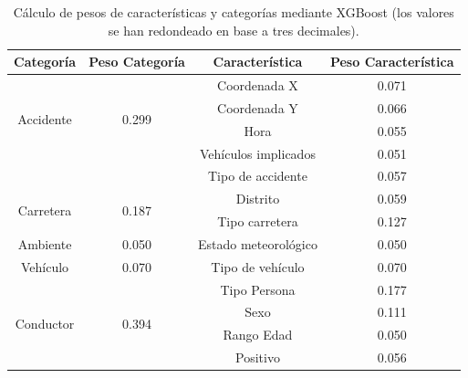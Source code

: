   \begin{table}[H]
    \centering
    \begin{tabular}{ |c|c|c|c| }
         \hline
         \textbf{Categoría} & \textbf{Peso Categoría} & \textbf{Característica} & \textbf{Peso Característica}\\

         \hline
         \multirow{4}{*}{Accidente}   & \multirow{4}{*}{0.299}        & Coordenada X          & 0.071\\
                                      &                               & Coordenada Y          & 0.066\\
                                      &                               & Hora                  & 0.055\\
                                      &                               & Vehículos implicados  & 0.051\\
                                      &                               & Tipo de accidente     & 0.057\\

         \hline
         \multirow{2}{*}{Carretera}   & \multirow{2}{*}{0.187}        & Distrito              & 0.059\\      
                                      &                               & Tipo carretera        & 0.127\\

         \hline
         \multirow{1}{*}{Ambiente}    & \multirow{1}{*}{0.050}        & Estado meteorológico  & 0.050\\

         \hline
         \multirow{1}{*}{Vehículo}    & \multirow{1}{*}{0.070}        & Tipo de vehículo      & 0.070\\


         \hline
         \multirow{4}{*}{Conductor}   & \multirow{4}{*}{0.394}        & Tipo Persona          & 0.177\\
                                      &                               & Sexo                  & 0.111\\
                                      &                               & Rango Edad            & 0.050\\
                                      &                               & Positivo              & 0.056\\
         \hline

    \end{tabular}

    \caption{Cálculo de pesos de características y categorías mediante XGBoost (los valores se han redondeado en base a tres decimales).}
    \label{PesosFinalesCaracteristicas}
  \end{table}


